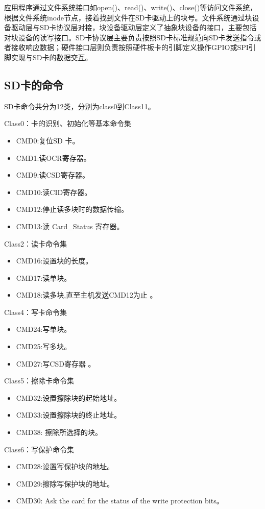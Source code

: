 应用程序通过文件系统接口如open()、read()、write()、close()等访问文件系统，根据文件系统inode节点，接着找到文件在SD卡驱动上的块号。文件系统通过块设备驱动层与SD卡协议层对接，块设备驱动层定义了抽象块设备的接口，主要包括对块设备的读写接口。SD卡协议层主要负责按照SD卡标准规范向SD卡发送指令或者接收响应数据；硬件接口层则负责按照硬件板卡的引脚定义操作GPIO或SPI引脚实现与SD卡的数据交互。

\subsection{SD卡的命令}
SD卡命令共分为12类，分别为class0到Class11。


Class0：卡的识别、初始化等基本命令集
\begin{itemize}
	\item CMD0:复位SD 卡。
	\item CMD1:读OCR寄存器。
	\item CMD9:读CSD寄存器。
	\item CMD10:读CID寄存器。
	\item CMD12:停止读多块时的数据传输。
	\item CMD13:读 Card\_Status 寄存器。
\end{itemize}

Class2：读卡命令集
\begin{itemize}
	\item CMD16:设置块的长度。
	\item CMD17:读单块。
	\item CMD18:读多块,直至主机发送CMD12为止 。
\end{itemize}

Class4：写卡命令集
\begin{itemize}
	\item CMD24:写单块。
	\item CMD25:写多块。
	\item CMD27:写CSD寄存器 。
\end{itemize}

Class5：擦除卡命令集
\begin{itemize}
	\item CMD32:设置擦除块的起始地址。
	\item CMD33:设置擦除块的终止地址。
	\item CMD38: 擦除所选择的块。
\end{itemize}

Class6：写保护命令集
\begin{itemize}
	\item CMD28:设置写保护块的地址。
	\item CMD29:擦除写保护块的地址。
	\item CMD30: Ask the card for the status of the write protection bits。
\end{itemize}

